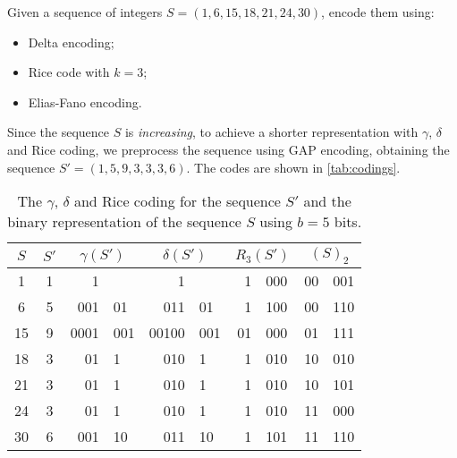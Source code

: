 \exercise

Given a sequence of integers $S = (1, 6, 15, 18, 21, 24, 30)$, encode them
using:
%
\begin{itemize}
  \item Delta encoding;
  \item Rice code with $k = 3$;
  \item Elias-Fano encoding.
\end{itemize}

\solution

Since the sequence $S$ is \emph{increasing}, to achieve a shorter representation
with $\gamma$, $\delta$ and Rice coding, we preprocess the sequence using GAP
encoding, obtaining the sequence $S' = (1, 5, 9, 3, 3, 3, 6)$. The codes are
shown in \autoref{tab:codings}.
%
\begin{table}[b]
  \centering
  \begin{tabular}{c|c||r@{\hskip 5pt}l|r@{\hskip 5pt}l|r@{\hskip 5pt}l||r@{\hskip 5pt}l}
    $S$ & $S'$ & \multicolumn{2}{c|}{$\gamma(S')$} & \multicolumn{2}{c|}{$\delta(S')$} & \multicolumn{2}{c||}{$R_3(S')$} & \multicolumn{2}{c}{$(S)_2$} \\\hline
    1  & 1 & 1 &        & 1 &         & 1 & 000  & 00 & 001 \\
    6  & 5 & 001 & 01   & 011 & 01    & 1 & 100  & 00 & 110 \\
    15 & 9 & 0001 & 001 & 00100 & 001 & 01 & 000 & 01 & 111 \\
    18 & 3 & 01 & 1     & 010 & 1     & 1 & 010  & 10 & 010 \\
    21 & 3 & 01 & 1     & 010 & 1     & 1 & 010  & 10 & 101 \\
    24 & 3 & 01 & 1     & 010 & 1     & 1 & 010  & 11 & 000 \\
    30 & 6 & 001 & 10   & 011 & 10    & 1 & 101  & 11 & 110 \\
  \end{tabular}

  \caption{The $\gamma$, $\delta$ and Rice coding for the sequence $S'$ and the
  binary representation of the sequence $S$ using $b = 5$ bits.}
  \label{tab:codings}

\end{table}

